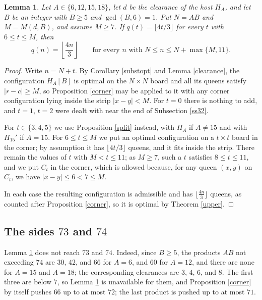 \documentclass[10pt,a4paper]{article}
\newtheorem{lemma}[theorem]{Lemma}
\theoremstyle{definition}
\begin{document}
\begin{lemma}
\label{block}
Let $A\in\{6, 12, 15, 18\}$, let $d$ be the clearance of the host
$H_A$, and let $B$ be an integer with $B\geqslant5$ and $\gcd(B,6)=1$. Put
$N=AB$ and $M=M(d,B)$, and assume $M\geqslant7$. If $q(t)=\lfloor4t/3\rfloor$ for every $t$ with
$6\leqslant t\leqslant M$, then
\[
q(n)=\left\lfloor\frac{4n}{3}\right\rfloor
\qquad\text{for every $n$ with $N\leqslant n\leqslant N+\max\{M,11\}$.}
\]
\end{lemma}

\begin{proof}
Write $n=N+t$. By Corollary \ref{substopt} and Lemma \ref{clearance}, the
configuration $H_A[B]$ is optimal on the $N\times N$ board and all its queens
satisfy $|r-c|\geqslant M$, so Proposition \ref{corner} may be applied to it
with any corner configuration lying inside the strip $|x-y|<M$. For $t=0$ there
is nothing to add, and $t=1$, $t=2$ were dealt with near the end of
Subsection \ref{ss32}.

For $t\in\{3,4,5\}$ we use Proposition \ref{split} instead, with $H_A$ if
$A\neq15$ and with $H_{15}'$ if $A=15$. For $6\leqslant t\leqslant M$ we put an
optimal configuration on a $t\times t$ board in the corner; by assumption it
has $\lfloor4t/3\rfloor$ queens, and it fits inside the strip. There remain the values of
$t$ with $M<t\leqslant11$; as $M\geqslant7$, such a $t$ satisfies
$8\leqslant t\leqslant11$, and we put $C_t$ in the corner, which is allowed
because, for any queen $(x,y)$ on $C_t$, we have $|x-y|\leqslant6<7\leqslant M$.

In each case the resulting configuration is admissible and has
$\lfloor\frac{4n}3\rfloor$ queens, as counted after Proposition \ref{corner},
so it is optimal by Theorem \ref{upper}.
\end{proof}

\subsection{The sides $73$ and $74$}
\label{s51}

Lemma \ref{block} does not reach $73$ and $74$. Indeed, since $B\geqslant5$,
the products $AB$ not exceeding $74$ are $30$, $42$, and $66$ for $A=6$, and $60$
for $A=12$, and there are none for $A=15$ and $A=18$; the corresponding
clearances are $3$, $4$, $6$, and $8$. The first three are below $7$, so
Lemma \ref{block} is unavailable for them, and Proposition \ref{corner} by itself pushes
$66$ up to at most $72$; the last product is pushed up to at most $71$.
\end{document}
